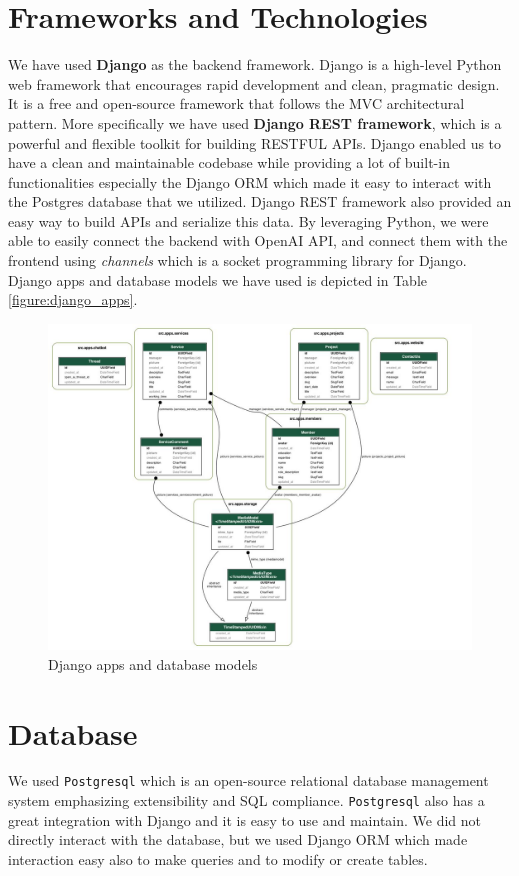 \section{Frameworks and Technologies}
We have used \textbf{Django} as the backend framework.
Django is a high-level Python web framework that encourages rapid development and clean, pragmatic design.
It is a free and open-source framework that follows the MVC architectural pattern.
More specifically we have used \textbf{Django REST framework}, which is a powerful and flexible toolkit for building RESTFUL APIs.
Django enabled us to have a clean and maintainable codebase while providing a lot of built-in functionalities especially the Django ORM which made it easy to interact with the Postgres database that we utilized. Django REST framework also provided  an easy way to build APIs and serialize this data.
By leveraging Python, we were able to easily connect the backend with OpenAI API, and connect them with the frontend using \textit{channels} which is a socket programming library for Django.
Django apps and database models we have used is depicted in Table \ref{figure:django_apps}.

\begin{figure}[htbp]
    \centering
    \includegraphics[width=0.7\linewidth]{img/django.jpeg}
    \caption{Django apps and database models}
    \label{fig:django_apps}
\end{figure}

\section{Database}
We used \texttt{Postgresql} which is an open-source relational database management system emphasizing extensibility and SQL compliance.
\texttt{Postgresql} also has a great integration with Django and it is easy to use and maintain.
We did not directly interact with the database, but we used Django ORM which made interaction easy also to make queries and to modify or create tables.

